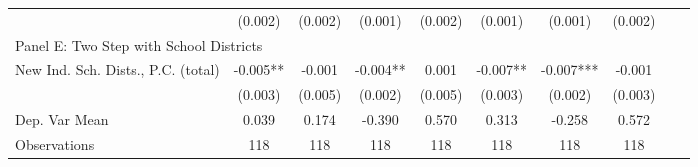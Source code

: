 \begin{tabular}{l*{9}{c}}
                &  (0.002)   &  (0.002)   &  (0.001)   &  (0.002)   &  (0.001)   &  (0.001)   &  (0.002)   \\
\cmidrule(lr){1-8}
\multicolumn{7}{l}{Panel E: Two Step with School Districts}\\
\cmidrule(lr){1-8}
New Ind. Sch. Dists., P.C. (total)&   -0.005** &   -0.001   &   -0.004** &    0.001   &   -0.007** &   -0.007***&   -0.001   \\
                &  (0.003)   &  (0.005)   &  (0.002)   &  (0.005)   &  (0.003)   &  (0.002)   &  (0.003)   \\
\midrule
Dep. Var Mean   &    0.039   &    0.174   &   -0.390   &    0.570   &    0.313   &   -0.258   &    0.572   \\
Observations    &      118   &      118   &      118   &      118   &      118   &      118   &      118   \\
       \bottomrule \end{tabular}
